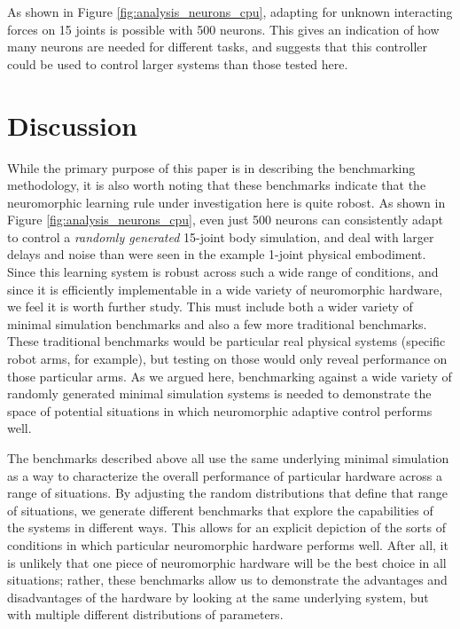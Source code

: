 \documentclass{frontiersSCNS} %
\begin{document}
As shown in Figure \ref{fig:analysis_neurons_cpu}, adapting for unknown
interacting forces on 15 joints is possible with 500 neurons.  This gives
an indication of how many neurons are needed for different tasks, and suggests
that this controller could be used to control larger systems than those tested here.

\section{Discussion}

While the primary purpose of this paper is in describing the benchmarking
methodology, it is also worth noting that these benchmarks indicate
that the neuromorphic learning rule under investigation here is quite robost.  As
shown in Figure \ref{fig:analysis_neurons_cpu}, even just 500 neurons can consistently
adapt to control a \emph{randomly generated} 15-joint body simulation, and
deal with larger delays and noise than were seen in the example 1-joint
physical embodiment.  Since this learning system is robust across such a
wide range of conditions, and since it is efficiently implementable in a
wide variety of neuromorphic hardware, we feel it is worth further study.  This must include 
both a wider variety of minimal simulation benchmarks and also a few more 
traditional benchmarks.  These traditional
benchmarks would be particular real physical systems (specific robot arms,
for example), but testing on those would only reveal performance on those
particular arms.  As we argued here, benchmarking against a wide variety of 
randomly generated minimal simulation systems is needed to demonstrate the
space of potential situations in which neuromorphic adaptive control performs well.

The benchmarks described above all use the same underlying minimal simulation
as a way to characterize the overall performance of particular hardware
across a range of situations.  By adjusting the random distributions that
define that range of situations, we generate different benchmarks that
explore the capabilities of the systems in different ways.  This allows for
an explicit depiction of the sorts of conditions in which particular
neuromorphic hardware performs well.  After all, it is unlikely that one
piece of neuromorphic hardware will be the best choice in all situations;
rather, these benchmarks allow us to demonstrate the advantages and disadvantages
of the hardware by looking at the same underlying system, but with multiple
different distributions of parameters.
\end{document}
